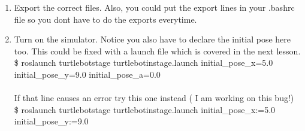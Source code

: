 \documentclass[12pt]{article}
\begin{document}
\begin{enumerate}
\begin{enumerate}
		\item Export the correct files. Also, you could put the export lines in your .bashrc file so you dont have to do the exports everytime.\\
		
		\item Turn on the simulator. Notice you also have to declare the initial pose here too. This could be fixed with a launch file which is covered in the next lesson. \\

{\selectfont   
        \$ roslaunch turtlebot\textunderscore stage turtlebot\textunderscore in\textunderscore stage.launch initial\_pose\_x=5.0 initial\_pose\_y=9.0 initial\_pose\_a=0.0 } \\\\

	If that line causes an error try this one instead ( I am working on this bug!)\\

{\selectfont  
 	\$ roslaunch turtlebot\textunderscore stage turtlebot\textunderscore in\textunderscore stage.launch initial\_pose\_x:=5.0 initial\_pose\_y:=9.0 }

	\end{enumerate}




\end{enumerate}
\end{document}
